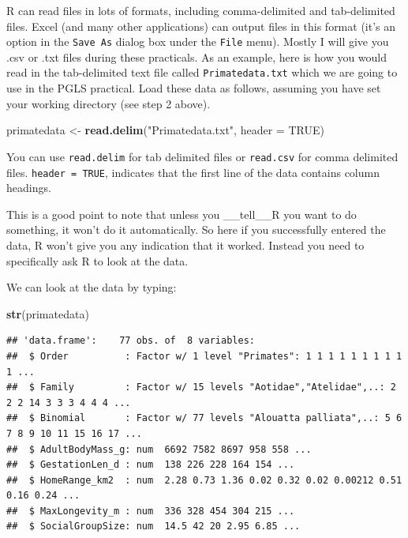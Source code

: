 \documentclass[]{book}
\newenvironment{Shaded}{\begin{snugshade}}{\end{snugshade}}
\newcommand{\KeywordTok}[1]{\textcolor[rgb]{0.13,0.29,0.53}{\textbf{{#1}}}}
\newcommand{\DataTypeTok}[1]{\textcolor[rgb]{0.13,0.29,0.53}{{#1}}}
\newcommand{\StringTok}[1]{\textcolor[rgb]{0.31,0.60,0.02}{{#1}}}
\newcommand{\OtherTok}[1]{\textcolor[rgb]{0.56,0.35,0.01}{{#1}}}
\newcommand{\NormalTok}[1]{{#1}}
\begin{document}
R can read files in lots of formats, including comma-delimited and
tab-delimited files. Excel (and many other applications) can output
files in this format (it's an option in the \texttt{Save\ As} dialog box
under the \texttt{File} menu). Mostly I will give you .csv or .txt files
during these practicals. As an example, here is how you would read in
the tab-delimited text file called \texttt{Primatedata.txt} which we are
going to use in the PGLS practical. Load these data as follows, assuming
you have set your working directory (see step 2 above).

\begin{Shaded}
\begin{Highlighting}[]
\NormalTok{primatedata <-}\StringTok{ }\KeywordTok{read.delim}\NormalTok{(}\StringTok{"Primatedata.txt"}\NormalTok{, }\DataTypeTok{header =} \OtherTok{TRUE}\NormalTok{)}
\end{Highlighting}
\end{Shaded}

You can use \texttt{read.delim} for tab delimited files or
\texttt{read.csv} for comma delimited files. \texttt{header\ =\ TRUE},
indicates that the first line of the data contains column headings.

This is a good point to note that unless you \_\_tell\_\_R you want to
do something, it won't do it automatically. So here if you successfully
entered the data, R won't give you any indication that it worked.
Instead you need to specifically ask R to look at the data.

We can look at the data by typing:

\begin{Shaded}
\begin{Highlighting}[]
\KeywordTok{str}\NormalTok{(primatedata)}
\end{Highlighting}
\end{Shaded}

\begin{verbatim}
## 'data.frame':    77 obs. of  8 variables:
##  $ Order          : Factor w/ 1 level "Primates": 1 1 1 1 1 1 1 1 1 1 ...
##  $ Family         : Factor w/ 15 levels "Aotidae","Atelidae",..: 2 2 2 14 3 3 3 4 4 4 ...
##  $ Binomial       : Factor w/ 77 levels "Alouatta palliata",..: 5 6 7 8 9 10 11 15 16 17 ...
##  $ AdultBodyMass_g: num  6692 7582 8697 958 558 ...
##  $ GestationLen_d : num  138 226 228 164 154 ...
##  $ HomeRange_km2  : num  2.28 0.73 1.36 0.02 0.32 0.02 0.00212 0.51 0.16 0.24 ...
##  $ MaxLongevity_m : num  336 328 454 304 215 ...
##  $ SocialGroupSize: num  14.5 42 20 2.95 6.85 ...
\end{verbatim}
\end{document}
